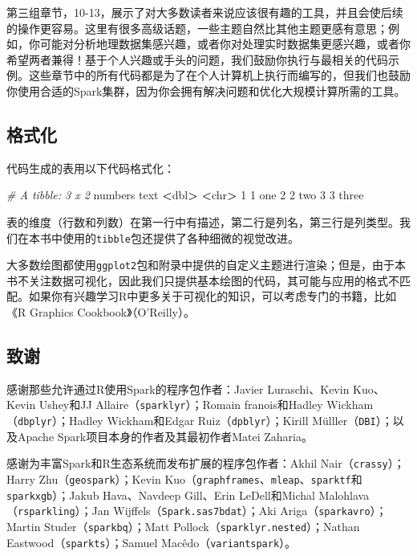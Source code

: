 \documentclass[
]{article}
\newenvironment{Shaded}{\begin{snugshade}}{\end{snugshade}}
\newcommand{\CommentTok}[1]{\textcolor[rgb]{0.56,0.35,0.01}{\textit{#1}}}
\newcommand{\DecValTok}[1]{\textcolor[rgb]{0.00,0.00,0.81}{#1}}
\newcommand{\ErrorTok}[1]{\textcolor[rgb]{0.64,0.00,0.00}{\textbf{#1}}}
\newcommand{\NormalTok}[1]{#1}
\newcommand{\OperatorTok}[1]{\textcolor[rgb]{0.81,0.36,0.00}{\textbf{#1}}}
\newcommand{\StringTok}[1]{\textcolor[rgb]{0.31,0.60,0.02}{#1}}
\begin{document}
第三组章节，10-13，展示了对大多数读者来说应该很有趣的工具，并且会使后续的操作更容易。这里有很多高级话题，一些主题自然比其他主题更感有意思；例如，你可能对分析地理数据集感兴趣，或者你对处理实时数据集更感兴趣，或者你希望两者兼得！基于个人兴趣或手头的问题，我们鼓励你执行与最相关的代码示例。这些章节中的所有代码都是为了在个人计算机上执行而编写的，但我们也鼓励你使用合适的Spark集群，因为你会拥有解决问题和优化大规模计算所需的工具。

\hypertarget{ux683cux5f0fux5316}{%
\subsection{格式化}\label{ux683cux5f0fux5316}}

代码生成的表用以下代码格式化：

\begin{Shaded}
\begin{Highlighting}[]
\CommentTok{# A tibble: 3 x 2}
\NormalTok{numbers text}
\OperatorTok{<}\NormalTok{dbl}\OperatorTok{>}\StringTok{ }\ErrorTok{<}\NormalTok{chr}\OperatorTok{>}
\DecValTok{1} \DecValTok{1}\NormalTok{ one}
\DecValTok{2} \DecValTok{2}\NormalTok{ two}
\DecValTok{3} \DecValTok{3}\NormalTok{ three}
\end{Highlighting}
\end{Shaded}

表的维度（行数和列数）在第一行中有描述，第二行是列名，第三行是列类型。我们在本书中使用的\texttt{tibble}包还提供了各种细微的视觉改进。

大多数绘图都使用\texttt{ggplot2}包和附录中提供的自定义主题进行渲染；但是，由于本书不关注数据可视化，因此我们只提供基本绘图的代码，其可能与应用的格式不匹配。如果你有兴趣学习R中更多关于可视化的知识，可以考虑专门的书籍，比如《R
Graphics Cookbook》（O'Reilly）。

\hypertarget{ux81f4ux8c22}{%
\subsection{致谢}\label{ux81f4ux8c22}}

感谢那些允许通过R使用Spark的程序包作者：Javier Luraschi、Kevin
Kuo、Kevin Ushey和JJ Allaire（\texttt{sparklyr}）；Romain
franois和Hadley Wickham（\texttt{dbplyr}）；Hadley Wickham和Edgar
Ruiz（\texttt{dpblyr}）；Kirill Mülller（\texttt{DBI}）；以及Apache
Spark项目本身的作者及其最初作者Matei Zaharia。

感谢为丰富Spark和R生态系统而发布扩展的程序包作者：Akhil
Nair（\texttt{crassy}）；Harry Zhu（\texttt{geospark}）；Kevin
Kuo（\texttt{graphframes}、\texttt{mleap}、\texttt{sparktf}和\texttt{sparkxgb}）；Jakub
Hava、Navdeep Gill、Erin LeDell和Michal
Malohlava（\texttt{rsparkling}）；Jan
Wijffels（\texttt{Spark.sas7bdat}）；Aki
Ariga（\texttt{sparkavro}）；Martin Studer（\texttt{sparkbq}）；Matt
Pollock（\texttt{sparklyr.nested}）；Nathan
Eastwood（\texttt{sparkts}）；Samuel Macêdo（\texttt{variantspark}）。
\end{document}
